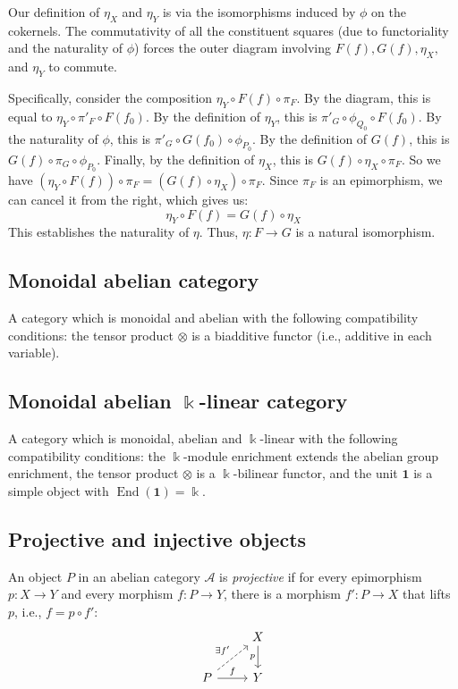 \documentclass[11pt]{article}
\theoremstyle{definition}
\begin{document}
Our definition of $\eta_X$ and $\eta_Y$ is via the isomorphisms induced by $\phi$ on the cokernels. The commutativity of all the constituent squares (due to functoriality and the naturality of $\phi$) forces the outer diagram involving $F(f), G(f), \eta_X,$ and $\eta_Y$ to commute.

Specifically, consider the composition $\eta_Y \circ F(f) \circ \pi_F$. By the diagram, this is equal to $\eta_Y \circ \pi'_F \circ F(f_0)$. By the definition of $\eta_Y$, this is $\pi'_G \circ \phi_{Q_0} \circ F(f_0)$. By the naturality of $\phi$, this is $\pi'_G \circ G(f_0) \circ \phi_{P_0}$. By the definition of $G(f)$, this is $G(f) \circ \pi_G \circ \phi_{P_0}$. Finally, by the definition of $\eta_X$, this is $G(f) \circ \eta_X \circ \pi_F$.
So we have $(\eta_Y \circ F(f)) \circ \pi_F = (G(f) \circ \eta_X) \circ \pi_F$. Since $\pi_F$ is an epimorphism, we can cancel it from the right, which gives us:
\[
\eta_Y \circ F(f) = G(f) \circ \eta_X
\]
This establishes the naturality of $\eta$. Thus, $\eta: F \to G$ is a natural isomorphism.




      
\subsection{Monoidal abelian category}
A category which is monoidal and abelian with the following compatibility conditions: the tensor product \(\otimes\) is a biadditive functor (i.e., additive in each variable).

\subsection{Monoidal abelian \(\Bbbk\)-linear category}
A category which is monoidal, abelian and \(\Bbbk\)-linear with the following compatibility conditions: the \(\Bbbk\)-module enrichment extends the abelian group enrichment, the tensor product \(\otimes\) is a \(\Bbbk\)-bilinear functor, and the unit \(\mathbf{1}\) is a simple object with \(\operatorname{End}(\mathbf{1}) = \Bbbk\).

\subsection{Projective and injective objects}
An object \(P\) in an abelian category \(\mathcal{A}\) is \emph{projective} if for every epimorphism \(p: X \to Y\) and every morphism \(f: P \to Y\), there is a morphism \(f': P \to X\) that lifts \(p\), i.e., \(f = p \circ f'\):
\[
\begin{tikzcd}
& X \arrow[d, "p"'] \\
P \arrow[r, "f"] \arrow[ur, dashed, "\exists f'"] & Y
\end{tikzcd}
\]
\end{document}
